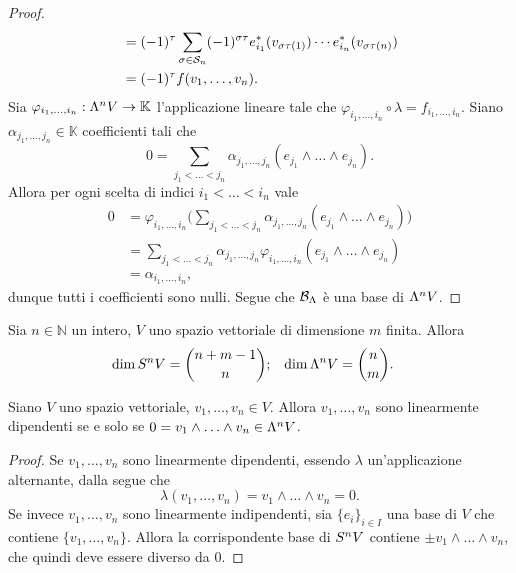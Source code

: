 \begin{proof}
\begin{align*}
&=(-1)^\tau\sum_{\sigma\in\mathcal{S}_n}(-1)^{\sigma\tau} e_{i_1}^*(v_{\sigma\tau(1)})\cdots e_{i_n}^*(v_{\sigma\tau(n)})\\
&=(-1)^\tau f(v_1,\ldots,v_n).
\end{align*}
Sia $\varphi_{i_1,\ldots,i_n}:\Lambda^nV\to\mathbb{K}$ l'applicazione lineare tale che $\varphi_{i_1,\ldots,i_n}\circ\lambda=f_{i_1,\ldots,i_n}$. Siano $\alpha_{j_1,\ldots,j_n}\in\mathbb{K}$ coefficienti tali che
$$
0=\sum_{j_1<\ldots<j_n}\alpha_{j_1,\ldots,j_n}(e_{j_1}\wedge\ldots\wedge e_{j_n}).
$$
Allora per ogni scelta di indici $i_1<\ldots<i_n$ vale
\begin{align*}
0&=\varphi_{i_1,\ldots,i_n}\biggl(\sum_{j_1<\ldots<j_n}\alpha_{j_1,\ldots,j_n}(e_{j_1}\wedge\ldots\wedge e_{j_n})\biggr)\\
&=\sum_{j_1<\ldots<j_n}\alpha_{j_1,\ldots,j_n}\varphi_{i_1,\ldots,i_n}(e_{j_1}\wedge\ldots\wedge e_{j_n})\\
&=\alpha_{i_1,\ldots,i_n},
\end{align*}
dunque tutti i coefficienti sono nulli. Segue che $\mathcal{B}_\Lambda$ è una base di $\Lambda^nV$.
\end{proof}

\begin{corollary}
Sia $n\in\mathbb{N}$ un intero, $V$ uno spazio vettoriale di dimensione $m$ finita. Allora
\begin{align*}
\dim S^nV&=\binom{n+m-1}{n};&\dim\Lambda^nV&=\binom{n}{m}.
\end{align*}
\end{corollary}

\begin{corollary}
Siano $V$ uno spazio vettoriale, $v_1,\ldots, v_n\in V$. Allora $v_1,\ldots, v_n$ sono linearmente dipendenti se e solo se $0=v_1\wedge\ldots\wedge v_n\in\Lambda^nV$.
\end{corollary}
\begin{proof}
Se $v_1,\ldots,v_n$ sono linearmente dipendenti, essendo $\lambda$ un'applicazione alternante, dalla  segue che 
$$
\lambda(v_1,\ldots,v_n)=v_1\wedge\ldots\wedge v_n=0.
$$
Se invece $v_1,\ldots,v_n$ sono linearmente indipendenti, sia $\{e_i\}_{i\in I}$ una base di $V$ che contiene $\{v_1,\ldots, v_n\}$. Allora la corrispondente base di $S^nV$ contiene $\pm v_1\wedge\ldots\wedge v_n$, che quindi deve essere diverso da 0.
\end{proof}

